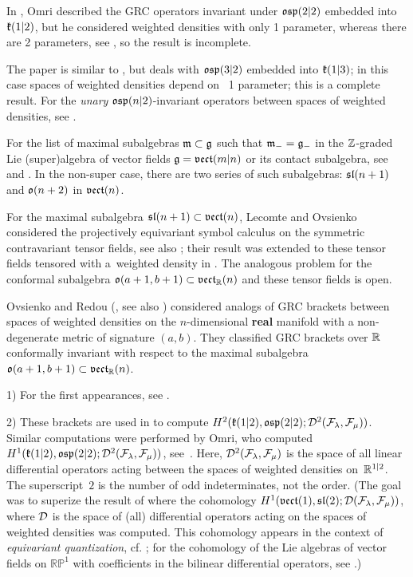 \documentclass[12pt,a4paper]{amsart}
\theoremstyle{thm}
\theoremstyle{definition}
\begin{document}
In \cite{Om}, Omri  described the GRC  operators  invariant under $\fosp(2|2)$ embedded into $\fk(1|2)$, but he considered weighted densities with only 1 parameter, whereas there are 2 parameters, see \cite{BLS1}, so the result is incomplete.

The paper \cite{BLO} is similar to  \cite{Om}, but deals with $\fosp(3|2)$ embedded into $\fk(1|3)$; in this case spaces of weighted densities depend on~ 1 parameter; this is a complete result. For the \textit{unary} $\fosp(n|2)$-invariant operators between spaces of weighted densities, see \cite{BaL}.

  For the list of maximal subalgebras $\fm\subset\fg$ such that $\fm_-=\fg_-$ in the $\Zee$-graded Lie (super)algebra of vector fields $\fg=\fvect(m|n)$ or its contact subalgebra, see \cite[Table~(4)]{BLS1} and \cite{LShch}. In the non-super case, there are two series of such subalgebras: $\fsl(n+1)$ and $\fo(n+2)$ in $\fvect(n)$.

For the maximal subalgebra $\fsl(n+1)\subset\fvect(n)$, Lecomte and Ovsienko \cite{LO} considered the projectively equivariant symbol calculus on the symmetric contravariant tensor fields, see also \cite{DO1}; their result was extended to these tensor fields tensored with a~weighted density in \cite{Bou}. The analogous problem for the conformal subalgebra $\fo(a+1,b+1)\subset\fvect_\Ree(n)$ and these tensor fields is open. 

Ovsienko and Redou (\cite{OR}, see also \cite{BonLe, DGO, DO2}) considered analogs of GRC brackets between spaces of weighted densities on the $n$-dimensional \textbf{real} manifold with a non-degenerate metric of signature $(a,b)$. They classified GRC brackets over $\Ree$ conformally invariant with respect to the maximal subalgebra $\fo(a+1, b+1)\subset\fvect_\Ree(n)$.

 1) For the first appearances, see \cite{G, GT, H, CMZ}.

2) These brackets are used in \cite{BLO2} to compute $H^2(\fk(1|2), \fosp(2|2); {\cal D}^2(\cal F_\lambda, \cal F_\mu))$.  Similar computations were performed by Omri, who computed $H^1(\fk(1|2), \fosp(2|2); {\cal D}^2(\cal F_\lambda, \cal F_\mu))$, see~\cite[Thm.~4.1]{Om}. Here, ${\cal D}^2(\cal F_\lambda, \cal F_\mu)$ is the space of all linear differential operators acting between the spaces of weighted densities on~$\Ree^{1|2}$. The superscript~$2$ is the number of odd indeterminates, not the order. (The goal was to superize the result of \cite{BO} where the cohomology $H^1(\fvect(1), \fsl(2); {\cal D}(\cal F_\lambda, \cal F_\mu))$, where ${\cal D}$ is the space of (all) differential operators acting on the spaces of weighted densities was computed. This cohomology appears in the context of \textit{equivariant quantization}, cf. \cite{Me}; for the cohomology of the Lie algebras of vector fields on $\mathbb{RP}^1$ with coefficients in the bilinear differential operators, see \cite{Bc}.)
\end{document}
